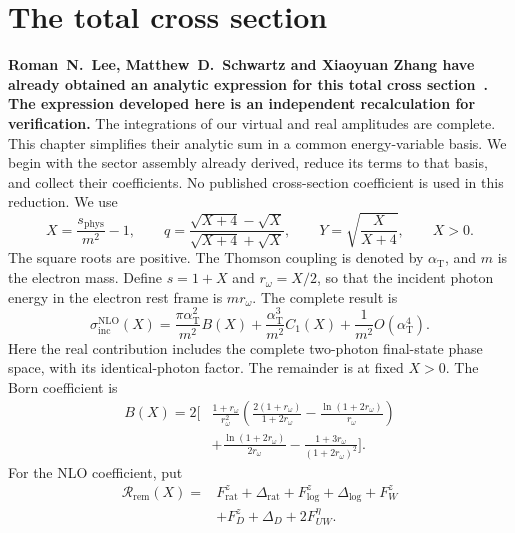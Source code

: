 \label{sec:compton-total-simplification}
\section{The total cross section}
\textbf{Roman~N.~Lee, Matthew~D.~Schwartz and Xiaoyuan Zhang have already obtained
an analytic expression for this total cross section~\cite{qed-processes-lsz}.
The expression developed here is an independent recalculation for
verification.}
The integrations of our virtual and real amplitudes are complete.
This chapter simplifies their analytic sum in a common energy-variable
basis. We begin with the sector assembly already derived, reduce its
terms to that basis, and collect their coefficients. No published
cross-section coefficient is used in this reduction.
We use
\begin{equation}
 X=\frac{s_{\mathrm{phys}}}{m^2}-1,\qquad
 q=\frac{\sqrt{X+4}-\sqrt X}{\sqrt{X+4}+\sqrt X},\qquad
 Y=\sqrt{\frac{X}{X+4}},\qquad X>0.
\end{equation}
The square roots are positive.  The Thomson coupling is denoted by
$\alpha_{\mathrm T}$, and $m$ is the electron mass.  Define
$s=1+X$ and $r_\omega=X/2$, so that the incident photon energy in the
electron rest frame is $m r_\omega$.  The complete result is
\begin{equation}
 \boxed{\sigma_{\mathrm{inc}}^{\mathrm{NLO}}(X)
 =\frac{\pi\alpha_{\mathrm T}^2}{m^2}B(X)
  +\frac{\alpha_{\mathrm T}^3}{m^2}C_1(X)
  +\frac1{m^2}O(\alpha_{\mathrm T}^4).}
 \label{eq:comp-simplified-total}
\end{equation}
Here the real contribution includes the complete two-photon final-state
phase space, with its identical-photon factor.  The remainder is at fixed
$X>0$.  The Born coefficient is
\begin{equation}
 \begin{aligned}
 B(X)=2\bigg[&\frac{1+r_\omega}{r_\omega^2}
 \left(\frac{2(1+r_\omega)}{1+2r_\omega}
       -\frac{\ln(1+2r_\omega)}{r_\omega}\right)\\
 &+\frac{\ln(1+2r_\omega)}{2r_\omega}
       -\frac{1+3r_\omega}{(1+2r_\omega)^2}\bigg].
 \end{aligned}
 \label{eq:comp-simplified-born}
\end{equation}
For the NLO coefficient, put
\begin{equation}
 \begin{aligned}
 \mathcal R_{\mathrm{rem}}(X)
 ={}&F_{\mathrm{rat}}^z+\Delta_{\mathrm{rat}}
       +F_{\log}^z+\Delta_{\log}+F_W^z\\
       &+F_D^z+\Delta_D+2F_{UW}^{\eta}.
 \end{aligned}
 \label{eq:comp-simplified-real-remainder}
\end{equation}

